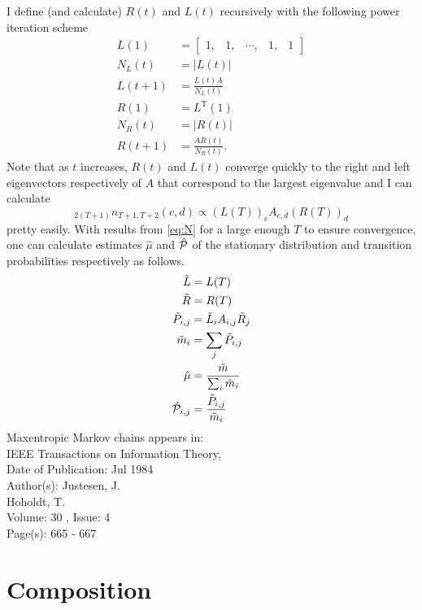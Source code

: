 \documentclass[12pt]{article} \usepackage{amsmath,amsfonts}
\newcommand{\T}{{\cal P}}
\begin{document}
I define (and calculate) $R(t)$ and $L(t)$ recursively with the
following power iteration scheme
\begin{align*}
  L(1) &= \begin{bmatrix} 1,&1,&\cdots,&1,&1\end{bmatrix} \\
  N_L(t) &= \left| L(t) \right| \\
  L(t+1) &= \frac{L(t) A}{N_L(t)} \\
  R(1) &= L^{\text{T}}(1) \\
  N_R(t) &= \left| R(t) \right| \\
  R(t+1) &= \frac{A R(t)}{N_R(t)}.
\end{align*}
Note that as $t$ increases, $R(t)$ and $L(t)$ converge quickly to the
right and left eigenvectors respectively of $A$ that correspond to the
largest eigenvalue and I can calculate
\begin{equation}
  \label{eq:N}
   _{2(T+1)}n_{T+1,T+2}(c,d) \propto \left(L(T)\right)_c  A_{c,d}
   \left(R(T)\right)_d
\end{equation}
pretty easily.  With results from \eqref{eq:N} for a large enough $T$
to ensure convergence, one can calculate estimates $\hat \mu$ and
$\hat \T$ of the stationary distribution and transition probabilities
respectively as follows.
\begin{align*}
  \tilde L &= L(T) \\
  \tilde R &= R(T) \\
  \tilde P_{i,j} &= \tilde L_i A_{i,j} \tilde R_j \\
  \tilde m_i &= \sum_j \tilde P_{i,j} \\
  \hat \mu &= \frac{\tilde m}{\sum_i \tilde m_i} \\
  \hat \T_{i,j} &= \frac{\tilde P_{i,j}}{\tilde m_i}
\end{align*}
Maxentropic Markov chains appears in:\\
IEEE Transactions on Information Theory, \\
Date of Publication: Jul 1984\\
Author(s): Justesen, J.\\
Hoholdt, T.\\
Volume: 30 , Issue: 4\\
Page(s): 665 - 667

\section{Composition}
\label{sec:composition}
\end{document}
